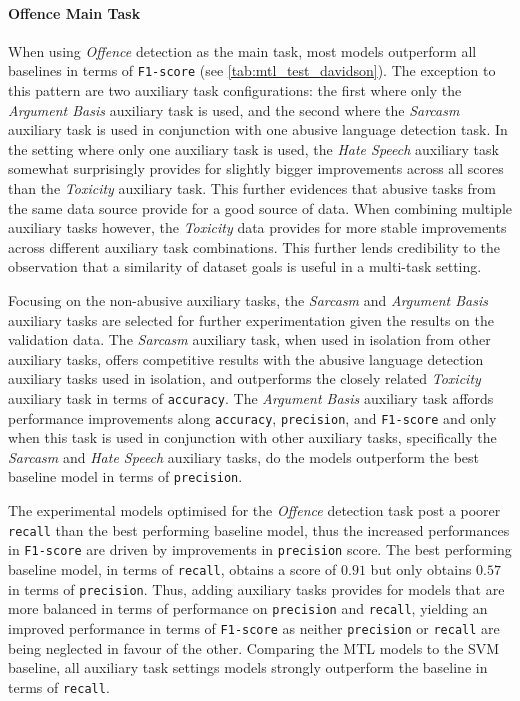 \paragraph{Offence Main Task}
When using \textit{Offence} detection as the main task, most models outperform all baselines in terms of \texttt{F1-score} (see \cref{tab:mtl_test_davidson}).
The exception to this pattern are two auxiliary task configurations: the first where only the \textit{Argument Basis} auxiliary task is used, and the second where the \textit{Sarcasm} auxiliary task is used in conjunction with one abusive language detection task.
In the setting where only one auxiliary task is used, the \textit{Hate Speech} auxiliary task somewhat surprisingly provides for slightly bigger improvements across all scores than the \textit{Toxicity} auxiliary task.
This further evidences that abusive tasks from the same data source provide for a good source of data.
When combining multiple auxiliary tasks however, the \textit{Toxicity} data provides for more stable improvements across different auxiliary task combinations.
This further lends credibility to the observation that a similarity of dataset goals is useful in a multi-task setting.

Focusing on the non-abusive auxiliary tasks, the \textit{Sarcasm} and \textit{Argument Basis} auxiliary tasks are selected for further experimentation given the results on the validation data.
The \textit{Sarcasm} auxiliary task, when used in isolation from other auxiliary tasks, offers competitive results with the abusive language detection auxiliary tasks used in isolation, and outperforms the closely related \textit{Toxicity} auxiliary task in terms of \texttt{accuracy}.
The \textit{Argument Basis} auxiliary task affords performance improvements along \texttt{accuracy}, \texttt{precision}, and \texttt{F1-score} and only when this task is used in conjunction with other auxiliary tasks, specifically the \textit{Sarcasm} and \textit{Hate Speech} auxiliary tasks, do the models outperform the best baseline model in terms of \texttt{precision}.

The experimental models optimised for the \textit{Offence} detection task post a poorer \texttt{recall} than the best performing baseline model, thus the increased performances in \texttt{F1-score} are driven by improvements in \texttt{precision} score.
The best performing baseline model, in terms of \texttt{recall}, obtains a score of $0.91$ but only obtains $0.57$ in terms of \texttt{precision}.
Thus, adding auxiliary tasks provides for models that are more balanced in terms of performance on \texttt{precision} and \texttt{recall}, yielding an improved performance in terms of \texttt{F1-score} as neither \texttt{precision} or \texttt{recall} are being neglected in favour of the other.
Comparing the MTL models to the SVM baseline, all auxiliary task settings models strongly outperform the baseline in terms of \texttt{recall}.

